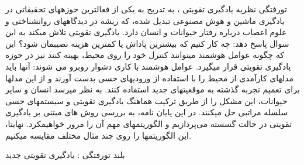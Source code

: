 


\pagestyle{empty}

‌تورفتگی
نظریه یادگیری تقویتی 
،
به تدریج به یکی از فعال\nf ترین حوزه\nf های تحقیقاتی در یادگیری ماشین و هوش مصنوعی تبدیل شده، که ریشه در دیدگاه\nf های روانشناختی و علوم اعصاب درباره رفتار حیوانات و انسان دارد. یادگیری تقویتی تلاش می\nf کند به این سوال پاسخ دهد: چه کار کنیم که بیش\nf ترین پاداش یا کم\nf ترین هزینه نصیبمان شود؟ این که چگونه عوامل هوشمند می\nf توانند کنترل خود را روی محیط، بهینه کنند نیز در حوزه یادگیری تقویتی قرار می\nf گیرد. عوامل هوشمند با کاری دشوار روبرو می شوند: آنها باید مدل\nf های کارآمدی از محیط را با استفاده از ورودی\nf های حسی بدست آورند و از این مدل\nf ها برای تعمیم تجربه گذشته به موقعیت\nf های جدید استفاده کنند. به نظر می\nf رسد انسان و سایر حیوانات، این مشکل را از طریق ترکیب هماهنگ یادگیری تقویتی و سیستم\nf های حسی سلسله مراتبی حل می\nf کنند. در این پایان نامه، به بررسی روش های مبتنی بر یادگیری تقویتی در حالت گسسته می‌پردازیم و الگوریتم\nf های مهم آن را مرور خواهیم\nf کرد. نهایتا، این الگوریتم\nf ها را روی چند مثال مختلف مقایسه می\nf کنیم.

‌بلند
‌تورفتگی : 
یادگیری تقویتی
‌جدید
